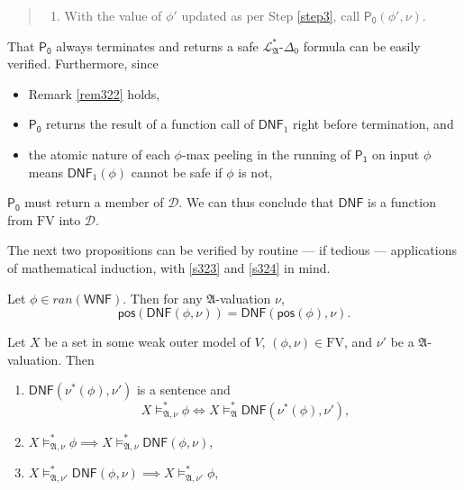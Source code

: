 \documentclass[12pt]{article}
\numberwithin{equation}{section}
\begin{document}
\begin{quote}
\begin{enumerate}[label=(\arabic*)]
        \item With the value of $\phi'$ updated as per Step \ref{step3}, call $\mathsf{P_0}(\phi', \nu)$.
    \end{enumerate}
\end{quote}

\begin{rem}\label{rem324}
That $\mathsf{P_0}$ always terminates and returns a safe $\mathcal{L}^{*}_{\mathfrak{A}}$-$\Delta_0$ formula can be easily verified. Furthermore, since 
\begin{itemize}
    \item Remark \ref{rem322} holds,
    \item $\mathsf{P_0}$ returns the result of a function call of $\mathsf{DNF}_1$ right before termination, and
    \item the atomic nature of each $\phi$-max peeling in the running of $\mathsf{P_1}$ on input $\phi$ means $\mathsf{DNF}_1(\phi)$ cannot be safe if $\phi$ is not,
\end{itemize}
$\mathsf{P_0}$ must return a member of $\mathcal{D}$. We can thus conclude that $\mathsf{DNF}$ is a function from $\mathrm{FV}$ into $\mathcal{D}$.
\end{rem}

The next two propositions can be verified by routine --- if tedious --- applications of mathematical induction, with \ref{s323} and \ref{s324} in mind.

\begin{prop}\label{prop321}
Let $\phi \in ran(\mathsf{WNF})$. Then for any $\mathfrak{A}$-valuation $\nu$,
\begin{equation*}
    \mathsf{pos}(\mathsf{DNF}(\phi, \nu)) = \mathsf{DNF}(\mathsf{pos}(\phi), \nu) \text{.}
\end{equation*}
\end{prop}

\begin{prop}\label{p320}
Let $X$ be a set in some weak outer model of $V$, $(\phi, \nu) \in \mathrm{FV}$, and $\nu'$ be a $\mathfrak{A}$-valuation. Then
\begin{enumerate}[label=(\arabic*)]
    \item\label{p3201} $\mathsf{DNF}(\nu^*(\phi), \nu')$ is a sentence and $$X \models^*_{\mathfrak{A}, \nu} \phi \iff X \models^*_{\mathfrak{A}} \mathsf{DNF}(\nu^*(\phi), \nu') \text{,}$$
    \item\label{p3202} $X \models^*_{\mathfrak{A}, \nu} \phi \implies X \models^*_{\mathfrak{A}, \nu} \mathsf{DNF}(\phi, \nu)$,
    \item\label{p3203} $X \models^*_{\mathfrak{A}, \nu'} \mathsf{DNF}(\phi, \nu) \implies X \models^*_{\mathfrak{A}, \nu'} \phi$,
\end{enumerate}
\end{prop}
\end{document}
